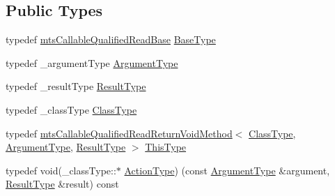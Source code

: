\subsection*{Public Types}
\begin{DoxyCompactItemize}
\item 
typedef \hyperlink{classmts_callable_qualified_read_base}{mts\+Callable\+Qualified\+Read\+Base} \hyperlink{classmts_callable_qualified_read_return_void_method_ac485c35956ba406a7863f66264b290d4}{Base\+Type}
\item 
typedef \+\_\+argument\+Type \hyperlink{classmts_callable_qualified_read_return_void_method_a6edb7e6ad0ead0f74cfe2751d45532c5}{Argument\+Type}
\item 
typedef \+\_\+result\+Type \hyperlink{classmts_callable_qualified_read_return_void_method_a533ffd51ea529b0a585985eaf06ab08f}{Result\+Type}
\item 
typedef \+\_\+class\+Type \hyperlink{classmts_callable_qualified_read_return_void_method_ae99cfab8208eb374f2cdf01c97edfa3b}{Class\+Type}
\item 
typedef \hyperlink{classmts_callable_qualified_read_return_void_method}{mts\+Callable\+Qualified\+Read\+Return\+Void\+Method}$<$ \hyperlink{classmts_callable_qualified_read_return_void_method_ae99cfab8208eb374f2cdf01c97edfa3b}{Class\+Type}, \hyperlink{classmts_callable_qualified_read_return_void_method_a6edb7e6ad0ead0f74cfe2751d45532c5}{Argument\+Type}, \hyperlink{classmts_callable_qualified_read_return_void_method_a533ffd51ea529b0a585985eaf06ab08f}{Result\+Type} $>$ \hyperlink{classmts_callable_qualified_read_return_void_method_a916abe9c683c314f85c9b67c960a67f9}{This\+Type}
\item 
typedef void(\+\_\+class\+Type\+::$\ast$ \hyperlink{classmts_callable_qualified_read_return_void_method_a90bf5eae1c7fdee0396313ce6de022bb}{Action\+Type}) (const \hyperlink{classmts_callable_qualified_read_return_void_method_a6edb7e6ad0ead0f74cfe2751d45532c5}{Argument\+Type} \&argument, \hyperlink{classmts_callable_qualified_read_return_void_method_a533ffd51ea529b0a585985eaf06ab08f}{Result\+Type} \&result) const 
\end{DoxyCompactItemize}
